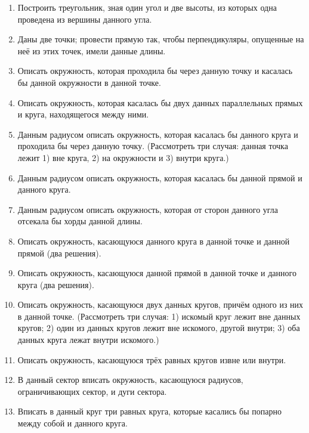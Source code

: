 {\begin{enumerate}
\item
Построить треугольник, зная один угол и две высоты, из которых одна проведена из вершины данного угла.

\item
Даны две точки;
провести прямую так, чтобы перпендикуляры, опущенные на неё из этих точек, имели данные длины.

\item
Описать окружность, которая проходила бы через данную точку и касалась бы данной окружности в данной точке.

\item
Описать окружность, которая касалась бы двух данных параллельных прямых и круга, находящегося между ними.

\item
Данным радиусом описать окружность, которая касалась бы данного круга и проходила бы через данную точку.
(Рассмотреть три случая:
данная точка лежит 
1) вне круга, 
2) на окружности 
и 3) внутри круга.)

\item
Данным радиусом описать окружность, которая касалась бы данной прямой и данного круга.

\item
Данным радиусом описать окружность, которая от сторон данного угла отсекала бы хорды данной длины.

\item
Описать окружность, касающуюся данного круга в данной точке и данной прямой (два решения).

\item
Описать окружность, касающуюся данной прямой в данной точке и данного круга (два решения).

\item
Описать окружность, касающуюся двух данных кругов, причём одного из них в данной точке.
(Рассмотреть три случая:
1) искомый круг лежит вне данных кругов;
2) один из данных кругов лежит вне искомого, другой внутри;
3) оба данных круга лежат внутри искомого.)

\item
Описать окружность, касающуюся трёх равных кругов извне или внутри.

\item
В данный сектор вписать окружность, касающуюся радиусов, ограничивающих сектор, и дуги сектора.

\item
Вписать в данный круг три равных круга, которые касались бы попарно между собой и данного круга.


\end{enumerate}}
